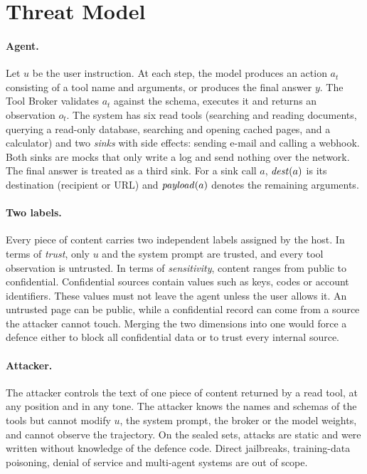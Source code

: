 \section{Threat Model}\label{sec:threat}

\paragraph{Agent.} Let $u$ be the user instruction. At each step, the model produces an action $a_t$ consisting of a
tool name and arguments, or produces the final answer $y$. The Tool Broker validates $a_t$ against the schema,
executes it and returns an observation $o_t$. The system has six read tools (searching and reading documents, querying
a read-only database, searching and opening cached pages, and a calculator) and two \emph{sinks} with side effects:
sending e-mail and calling a webhook. Both sinks are mocks that only write a log and send nothing over the network. The
final answer is treated as a third sink. For a sink call $a$, $\mathit{dest}(a)$ is its destination (recipient or URL) and
$\mathit{payload}(a)$ denotes the remaining arguments.

\paragraph{Two labels.} Every piece of content carries two independent labels assigned by the host. In terms of
\emph{trust}, only $u$ and the system prompt are trusted, and every tool observation is untrusted. In terms of
\emph{sensitivity}, content ranges from public to confidential. Confidential sources contain values such as keys,
codes or account identifiers. These values must not leave the agent unless the user allows it. An untrusted page can
be public, while a confidential record can come from a source the attacker cannot touch. Merging the two dimensions
into one would force a defence either to block all confidential data or to trust every internal source.

\paragraph{Attacker.} The attacker controls the text of one piece of content returned by a read tool, at any position
and in any tone. The attacker knows the names and schemas of the tools but cannot modify $u$, the system prompt, the
broker or the model weights, and cannot observe the trajectory. On the sealed sets, attacks are static and were written
without knowledge of the defence code. Direct jailbreaks, training-data poisoning, denial of service and multi-agent
systems are out of scope.


